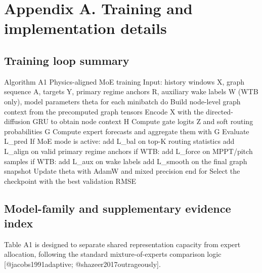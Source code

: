 \documentclass[
  journal]{IEEEtran}
\author{}
\date{}
\newenvironment{Shaded}{}{}
\newcommand{\NormalTok}[1]{#1}
\begin{document}
\section*{Appendix A. Training and implementation
details}\label{appendix-a.-training-and-implementation-details}

\FloatBarrier

\subsection*{Training loop summary}\label{training-loop-summary}

\begin{Shaded}
\begin{Highlighting}[]
\NormalTok{Algorithm A1  Physics{-}aligned MoE training}
\NormalTok{Input: history windows X, graph sequence A, targets Y, primary regime anchors R,}
\NormalTok{       auxiliary wake labels W (WTB only), model parameters theta}
\NormalTok{for each minibatch do}
\NormalTok{    Build node{-}level graph context from the precomputed graph tensors}
\NormalTok{    Encode X with the directed{-}diffusion GRU to obtain node context H}
\NormalTok{    Compute gate logits Z and soft routing probabilities G}
\NormalTok{    Compute expert forecasts and aggregate them with G}
\NormalTok{    Evaluate L\_pred}
\NormalTok{    If MoE mode is active:}
\NormalTok{        add L\_bal on top{-}K routing statistics}
\NormalTok{        add L\_align on valid primary regime anchors}
\NormalTok{        if WTB: add L\_force on MPPT/pitch samples}
\NormalTok{        if WTB: add L\_aux on wake labels}
\NormalTok{        add L\_smooth on the final graph snapshot}
\NormalTok{    Update theta with AdamW and mixed precision}
\NormalTok{end for}
\NormalTok{Select the checkpoint with the best validation RMSE}
\end{Highlighting}
\end{Shaded}

\FloatBarrier

\subsection*{Model-family and supplementary evidence
index}\label{model-family-and-supplementary-evidence-index}

Table A1 is designed to separate shared representation capacity from expert allocation, following the standard mixture-of-experts comparison logic [@jacobs1991adaptive; @shazeer2017outrageously].
\end{document}
